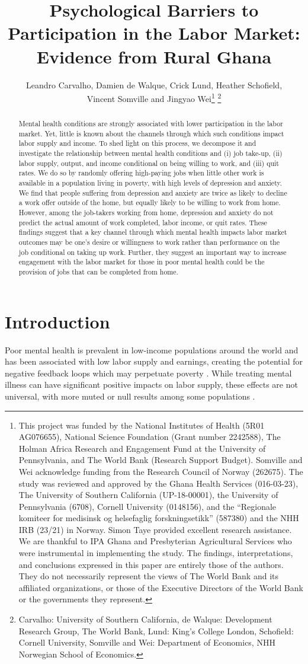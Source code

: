 \documentclass[12pt, a4paper, american]{article}
\title{Psychological Barriers to Participation in the Labor Market: Evidence from Rural Ghana}
\author{Leandro Carvalho, Damien de Walque, Crick Lund, Heather Schofield, \\ Vincent Somville and Jingyao Wei\thanks{This project was funded by the National Institutes of Health (5R01 AG076655), National Science Foundation (Grant number 2242588), The Holman Africa Research and Engagement Fund at the University of Pennsylvania, and The World Bank (Research Support Budget). Somville and Wei acknowledge funding from the Research Council of Norway (262675). The study was reviewed and approved by the Ghana Health Services (016-03-23), The University of Southern California (UP-18-00001), the University of Pennsylvania (6708), Cornell University (0148156), and the ``Regionale komiteer for medisinsk og helsefaglig forskningsetikk'' (587380) and the NHH IRB (23/21) in Norway. Simon Taye provided excellent research assistance. We are thankful to IPA Ghana and Presbyterian Agricultural Services who were instrumental in implementing the study.  The findings, interpretations, and conclusions expressed in this paper are entirely those of the  authors. They do not necessarily represent the views of The World Bank and its affiliated  organizations, or those of the Executive Directors of the World Bank or the governments they represent.} \thanks{Carvalho: University of Southern California, de Walque: Development Research Group, The World Bank, Lund: King's College London, Schofield:  Cornell University, Somville and Wei: Department of Economics, NHH Norwegian School of Economics.}}
\date{}
\begin{document}
\maketitle
\begin{abstract}
\singlespacing 
Mental health conditions are strongly associated with lower participation in the labor market. Yet, little is known about the channels through which such conditions impact labor supply and income. To shed light on this process, we decompose it and investigate the relationship between mental health conditions and (i) job take-up, (ii) labor supply, output, and income conditional on being willing to work, and (iii) quit rates. We do so by randomly offering high-paying jobs when little other work is available in a population living in poverty, with high levels of depression and anxiety. We find that people suffering from depression and anxiety are twice as likely to decline a work offer outside of the home, but equally likely to be willing to work from home. However, among the job-takers working from home, depression and anxiety do not predict the actual amount of work completed, labor income, or quit rates. These findings suggest that a key channel through which mental health impacts labor market outcomes may be one's desire or willingness to work rather than performance on the job conditional on taking up work. Further, they suggest an important way to increase engagement with the labor market for those in poor mental health could be the provision of jobs that can be completed from home.  
\end{abstract}

\clearpage


 
\clearpage

\section{Introduction}
Poor mental health is prevalent in low-income populations around the world and has been associated with low labor supply and earnings, creating the potential for negative feedback loops which may perpetuate poverty \citep{ridley_poverty_2020, world_health_organization_world_2022, hakulinen_mental_2019, biasi_career_2021, mojtabai_long-term_2015, lund_effects_2024, de_quidt_depression_2016,  barker_cognitive_2022, fuhr_delivering_2019, patel_lay_2011, weobong_sustained_2017}. While treating mental illness can have significant positive impacts on labor supply, these effects are not universal, with more muted or null results among some populations \citep{lund_effects_2024, barker_cognitive_2022,patel_poverty_2003, patel_healthy_2017, angelucci_economic_2024, baranov_maternal_2020,bhat_long-run_2022}. 
\end{document}
